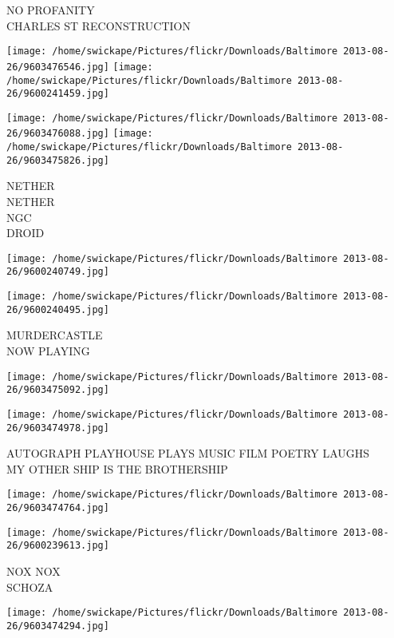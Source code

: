 \documentclass[10pt,letterpaper]{article}
\begin{document}
NO PROFANITY\\
CHARLES ST RECONSTRUCTION\\
\pagebreak

\texttt{[image: /home/swickape/Pictures/flickr/Downloads/Baltimore 2013-08-26/9603476546.jpg]}
\texttt{[image: /home/swickape/Pictures/flickr/Downloads/Baltimore 2013-08-26/9600241459.jpg]}

\texttt{[image: /home/swickape/Pictures/flickr/Downloads/Baltimore 2013-08-26/9603476088.jpg]}
\texttt{[image: /home/swickape/Pictures/flickr/Downloads/Baltimore 2013-08-26/9603475826.jpg]}

NETHER\\
NETHER\\
NGC\\
DROID\\
\pagebreak

\texttt{[image: /home/swickape/Pictures/flickr/Downloads/Baltimore 2013-08-26/9600240749.jpg]}

\vspace{0.25in}
\texttt{[image: /home/swickape/Pictures/flickr/Downloads/Baltimore 2013-08-26/9600240495.jpg]}

MURDERCASTLE\\
NOW PLAYING\\
\pagebreak

\texttt{[image: /home/swickape/Pictures/flickr/Downloads/Baltimore 2013-08-26/9603475092.jpg]}

\vspace{0.25in}
\texttt{[image: /home/swickape/Pictures/flickr/Downloads/Baltimore 2013-08-26/9603474978.jpg]}

AUTOGRAPH PLAYHOUSE PLAYS MUSIC FILM POETRY LAUGHS\\
MY OTHER SHIP IS THE BROTHERSHIP\\
\pagebreak

\texttt{[image: /home/swickape/Pictures/flickr/Downloads/Baltimore 2013-08-26/9603474764.jpg]}

\vspace{0.25in}
\texttt{[image: /home/swickape/Pictures/flickr/Downloads/Baltimore 2013-08-26/9600239613.jpg]}

NOX NOX\\
SCHOZA\\
\pagebreak

\texttt{[image: /home/swickape/Pictures/flickr/Downloads/Baltimore 2013-08-26/9603474294.jpg]}
\end{document}
